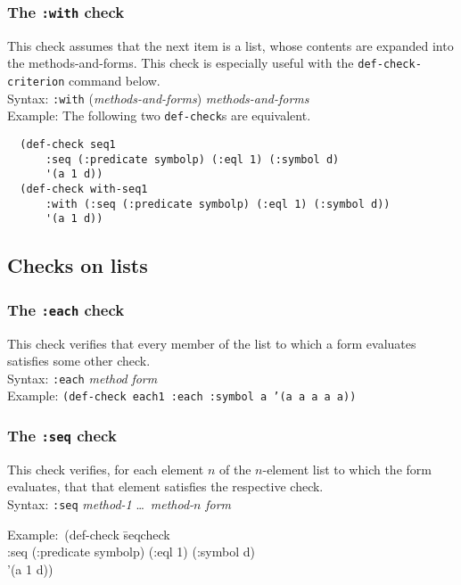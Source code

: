 \documentclass{article}
\begin{document}
\subsubsection{The \texttt{:with} check} 
This check assumes that the next item is a list, whose contents are
expanded into the methods-and-forms. This
check is especially useful with the \texttt{def-check-cri\-ter\-ion}
command below.
\\ Syntax: \texttt{:with} (\textit{methods-and-forms}) \textit{methods-and-forms}
\\ Example: The following two \texttt{def-check}s are equivalent.
\begin{verbatim}
  (def-check seq1
      :seq (:predicate symbolp) (:eql 1) (:symbol d)
      '(a 1 d))
  (def-check with-seq1
      :with (:seq (:predicate symbolp) (:eql 1) (:symbol d))
      '(a 1 d))
\end{verbatim}

\subsection{Checks on lists}

\subsubsection{The \texttt{:each} check} 
This check verifies that every member of the list to which a form
evaluates satisfies some other check.
\\ Syntax: \texttt{:each} \textit{method} \textit{form}
\\ Example: \texttt{(def-check each1 :each :symbol a '(a a a a a))}

\subsubsection{The \texttt{:seq} check} 
This check verifies, for each element $n$ of the $n$-element list to
which the form evaluates, that that element satisfies the respective
check.
\\ Syntax: \texttt{:seq} \textit{method-1} \ldots\ \textit{method-$n$} \textit{form}
{\ttfamily\begin{tabbing}
\textrm{Example:}\ (def-check \=seqcheck
\\ \>  :seq (:predicate symbolp) (:eql 1) (:symbol d)
\\ \>  '(a 1 d))
\end{tabbing}}
\end{document}
